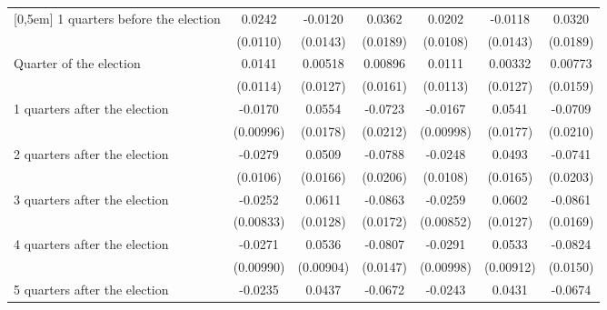 \begin{table}[!ht]
\begin{tabular}{l*{6}{c}}
[0,5em]
 1 quarters before the election&      0.0242\sym{*}  &     -0.0120         &      0.0362         &      0.0202         &     -0.0118         &      0.0320         \\
                    &    (0.0110)         &    (0.0143)         &    (0.0189)         &    (0.0108)         &    (0.0143)         &    (0.0189)         \\
[0,5em]
Quarter of the election&      0.0141         &     0.00518         &     0.00896         &      0.0111         &     0.00332         &     0.00773         \\
                    &    (0.0114)         &    (0.0127)         &    (0.0161)         &    (0.0113)         &    (0.0127)         &    (0.0159)         \\
[0,5em]
 1 quarters after the election&     -0.0170         &      0.0554\sym{**} &     -0.0723\sym{***}&     -0.0167         &      0.0541\sym{**} &     -0.0709\sym{***}\\
                    &   (0.00996)         &    (0.0178)         &    (0.0212)         &   (0.00998)         &    (0.0177)         &    (0.0210)         \\
[0,5em]
 2 quarters after the election&     -0.0279\sym{**} &      0.0509\sym{**} &     -0.0788\sym{***}&     -0.0248\sym{*}  &      0.0493\sym{**} &     -0.0741\sym{***}\\
                    &    (0.0106)         &    (0.0166)         &    (0.0206)         &    (0.0108)         &    (0.0165)         &    (0.0203)         \\
[0,5em]
 3 quarters after the election&     -0.0252\sym{**} &      0.0611\sym{***}&     -0.0863\sym{***}&     -0.0259\sym{**} &      0.0602\sym{***}&     -0.0861\sym{***}\\
                    &   (0.00833)         &    (0.0128)         &    (0.0172)         &   (0.00852)         &    (0.0127)         &    (0.0169)         \\
[0,5em]
 4 quarters after the election&     -0.0271\sym{**} &      0.0536\sym{***}&     -0.0807\sym{***}&     -0.0291\sym{**} &      0.0533\sym{***}&     -0.0824\sym{***}\\
                    &   (0.00990)         &   (0.00904)         &    (0.0147)         &   (0.00998)         &   (0.00912)         &    (0.0150)         \\
[0,5em]
 5 quarters after the election&     -0.0235\sym{*}  &      0.0437\sym{**} &     -0.0672\sym{***}&     -0.0243\sym{*}  &      0.0431\sym{**} &     -0.0674\sym{***}\\

\end{tabular}
\end{table}
